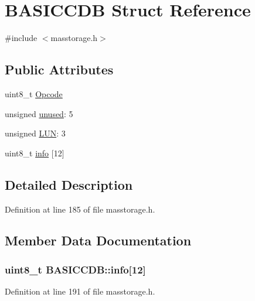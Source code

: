 \hypertarget{struct_b_a_s_i_c_c_d_b}{\section{\-B\-A\-S\-I\-C\-C\-D\-B \-Struct \-Reference}
\label{struct_b_a_s_i_c_c_d_b}
}


{\ttfamily \#include $<$masstorage.\-h$>$}

\subsection*{\-Public \-Attributes}
\begin{DoxyCompactItemize}
\item 
uint8\-\_\-t \hyperlink{struct_b_a_s_i_c_c_d_b_a64d8bea0216a84b8ba8c8f411ceae2c3}{\-Opcode}
\item 
unsigned \hyperlink{struct_b_a_s_i_c_c_d_b_a2c6031f3dde94acd5d03c80db213c534}{unused}\-: 5
\item 
unsigned \hyperlink{struct_b_a_s_i_c_c_d_b_a2cec985f2fd10576a004108c01d42fb4}{\-L\-U\-N}\-: 3
\item 
uint8\-\_\-t \hyperlink{struct_b_a_s_i_c_c_d_b_ae796279e9083692e308e7819349a79fc}{info} \mbox{[}12\mbox{]}
\end{DoxyCompactItemize}


\subsection{\-Detailed \-Description}


\-Definition at line 185 of file masstorage.\-h.



\subsection{\-Member \-Data \-Documentation}
\hypertarget{struct_b_a_s_i_c_c_d_b_ae796279e9083692e308e7819349a79fc}{
\subsubsection[{info}]{\setlength{\rightskip}{0pt plus 5cm}uint8\-\_\-t {\bf \-B\-A\-S\-I\-C\-C\-D\-B\-::info}\mbox{[}12\mbox{]}}}\label{struct_b_a_s_i_c_c_d_b_ae796279e9083692e308e7819349a79fc}


\-Definition at line 191 of file masstorage.\-h.

